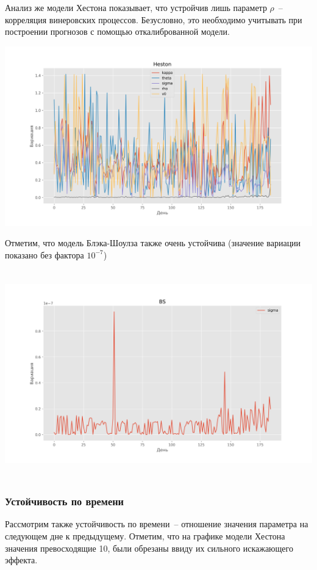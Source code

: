 \documentclass[oneside, final, 12pt, a4paper]{article}
\begin{document}
\newpage
Анализ же модели Хестона показывает, что устройчив лишь параметр $\rho$~-- корреляция винеровских процессов.
Безусловно, это необходимо учитывать при построении прогнозов с помощью откалиброванной модели. 

\begin{center}
  \includegraphics[width=1\linewidth]{img/heston_stable.png}
\end{center}

Отметим, что модель Блэка-Шоулза также очень устойчива (значение вариации показано без фактора $10^{-7}$)

\begin{center}
  \includegraphics[width=1\linewidth, height=9cm]{img/bs_stable.png}
\end{center}

\newpage
\subsubsection{Устойчивость по времени}
Рассмотрим также устойчивость по времени~-- отношение значения параметра на следующем дне к предыдущему. Отметим, что на графике модели Хестона значения превосходящие 10, были обрезаны ввиду их сильного искажающего эффекта.
\end{document}
